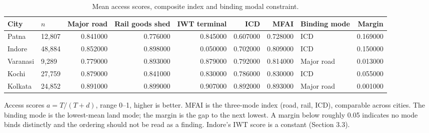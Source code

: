 \begin{table}[htbp]
\centering
\small
\caption{Mean access scores, composite index and binding modal constraint.}
\label{tab:t6_access}
\begin{tabular}{llrrrrrlr}
\toprule
City & $n$ & Major road & Rail goods shed & IWT terminal & ICD & MFAI & Binding mode & Margin \\
\midrule
Patna & 12,807 & 0.841000 & 0.776000 & 0.845000 & 0.607000 & 0.728000 & ICD & 0.169000 \\
Indore & 48,884 & 0.852000 & 0.898000 & 0.050000 & 0.702000 & 0.809000 & ICD & 0.150000 \\
Varanasi & 9,289 & 0.779000 & 0.893000 & 0.879000 & 0.792000 & 0.814000 & Major road & 0.013000 \\
Kochi & 27,759 & 0.879000 & 0.841000 & 0.830000 & 0.786000 & 0.830000 & ICD & 0.055000 \\
Kolkata & 24,852 & 0.891000 & 0.899000 & 0.907000 & 0.892000 & 0.893000 & Major road & 0.001000 \\
\bottomrule
\end{tabular}
\begin{tablenotes}\footnotesize
\item Access scores $a = T/(T+d)$, range 0–1, higher is better. MFAI is the three-mode index (road, rail, ICD), comparable across cities. The binding mode is the lowest-mean land mode; the margin is the gap to the next lowest. A margin below roughly 0.05 indicates no mode binds distinctly and the ordering should not be read as a finding. Indore's IWT score is a constant (Section 3.3).
\end{tablenotes}
\end{table}
